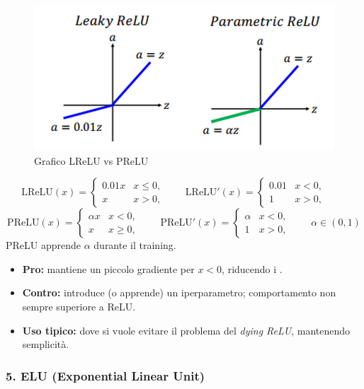 \documentclass[a4paper,12pt]{report}
\begin{document}
	\begin{figure}[H]
		\centering
		\includegraphics[width=1.0\textwidth]{img/lprelu.png}
		\caption{Grafico LReLU vs PReLU}
	\end{figure}
	
	\[
	\mathrm{LReLU}(x)=\begin{cases}0.01x & x\le0,\\ x & x>0,\end{cases}\qquad
	\mathrm{LReLU}'(x)=\begin{cases}0.01 & x<0,\\ 1 & x>0,\end{cases}\qquad
	\]
	\[
	\mathrm{PReLU}(x)=\begin{cases}\alpha x & x<0,\\ x & x\ge0,\end{cases}\qquad
	\mathrm{PReLU}'(x)=\begin{cases}\alpha & x<0,\\ 1 & x>0,\end{cases}\qquad \alpha\in(0,1)
	\]
	PReLU apprende $\alpha$ durante il training.
	\begin{itemize}
		\item \textbf{Pro:} mantiene un piccolo gradiente per $x<0$, riducendo i .
		\item \textbf{Contro:} introduce (o apprende) un iperparametro; comportamento non sempre superiore a ReLU.
		\item \textbf{Uso tipico:} dove si vuole evitare il problema del \emph{dying ReLU}, mantenendo semplicità.
	\end{itemize}
	
	\subsubsection{5. ELU (Exponential Linear Unit)}
	
\end{document}
